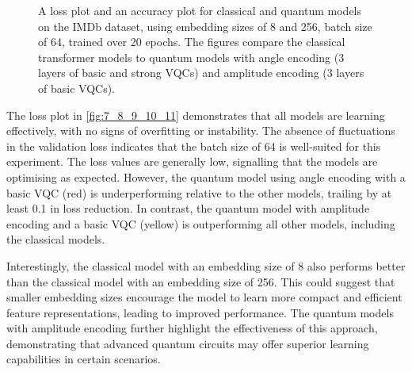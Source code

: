 \begin{figure}[h]
  \begin{center}
  \end{center}
  \vspace{-0.5cm}
  \caption{A loss plot and an accuracy plot for classical and quantum
    models on the IMDb dataset, using embedding sizes of 8 and 256,
    batch size of 64, trained over 20 epochs. The figures compare the
    classical transformer models to quantum models with angle encoding
    (3 layers of basic and strong \glspl{VQC}) and amplitude encoding
  (3 layers of basic \glspl{VQC}).}
  \label{fig:7_8_9_10_11}
\end{figure}

The loss plot in \autoref{fig:7_8_9_10_11} demonstrates that all
models are learning effectively, with no signs of overfitting or
instability. The absence of fluctuations in the validation loss
indicates that the batch size of 64 is well-suited for this
experiment. The loss values are generally low, signalling that the
models are optimising as expected. However, the quantum model using
angle encoding with a basic \gls{VQC} (red) is underperforming relative to
the other models, trailing by at least 0.1 in loss reduction. In
contrast, the quantum model with amplitude encoding and a basic \gls{VQC}
(yellow) is outperforming all other models, including the classical models.

Interestingly, the classical model with an embedding size of 8 also
performs better than the classical model with an embedding size of
256. This could suggest that smaller embedding sizes encourage the
model to learn more compact and efficient feature representations,
leading to improved performance. The quantum models with amplitude
encoding further highlight the effectiveness of this approach,
demonstrating that advanced quantum circuits may offer superior
learning capabilities in certain scenarios.

